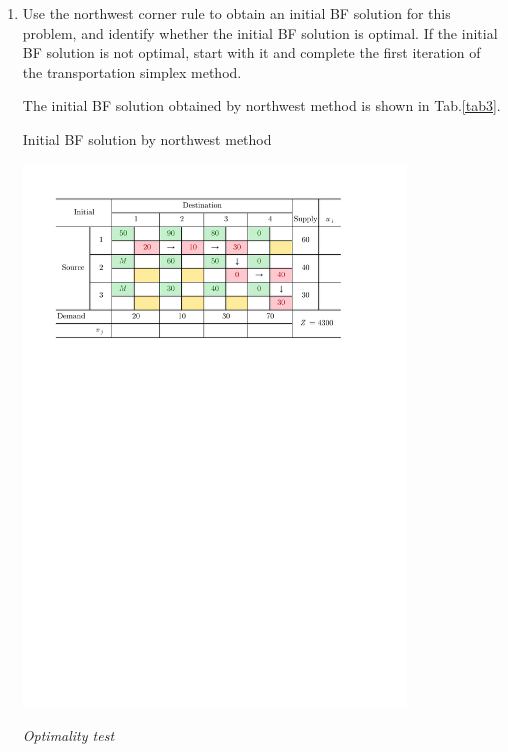\documentclass[a4paper]{article}
\begin{document}
\begin{enumerate}
\begin{enumerate}
\begin{solution}
	\end{solution}
	\vspace*{-1cm}
	\item Use the northwest corner rule to obtain an initial BF solution for this problem, and identify whether the initial BF solution is optimal. If the initial BF solution is not optimal, start with it and complete the first iteration of the transportation simplex method.
	\begin{solution}
		The initial BF solution obtained by northwest method is shown in Tab.\ref{tab3}.
		\begin{table}[h]
			\caption{Initial BF solution by northwest method}
			\label{tab3}
			\centering
			\includegraphics[width = 0.8\textwidth]{NW1}				
		\end{table}
		
		\textit{Optimality test}
		

\end{solution}
\end{enumerate}
\end{enumerate}
\end{document}
